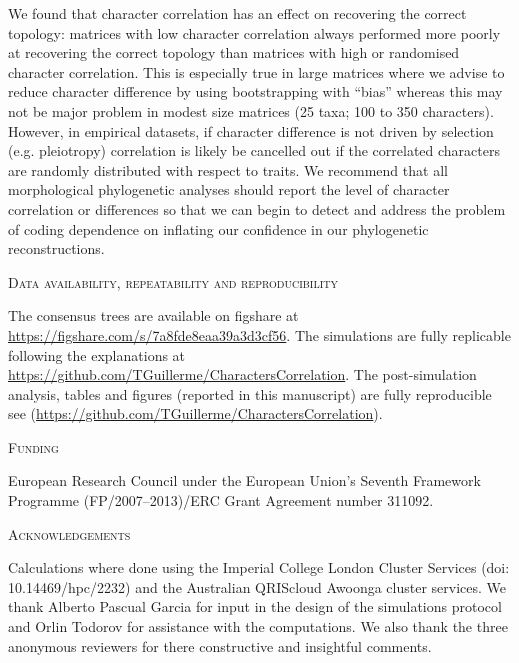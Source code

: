 \documentclass[12pt,letterpaper]{article}
\renewcommand{\section}[1]{%
\bigskip
\begin{center}
\begin{Large}
\normalfont\scshape #1
\medskip
\end{Large}
\end{center}}
\begin{document}
We found that character correlation has an effect on recovering the correct topology: matrices with low character correlation always performed more poorly at recovering the correct topology than matrices with high or randomised character correlation.
This is especially true in large matrices where we advise to reduce character difference by using bootstrapping with ``bias'' whereas this may not be major problem in modest size matrices (25 taxa; 100 to 350 characters).
However, in empirical datasets, if character difference is not driven by selection (e.g. pleiotropy) correlation is likely be cancelled out if the correlated characters are randomly distributed with respect to traits.
We recommend that all morphological phylogenetic analyses should report the level of character correlation or differences so that we can begin to detect and address the problem of coding dependence on inflating our confidence in our phylogenetic reconstructions.

\section{Data availability, repeatability and reproducibility}
The consensus trees are available on figshare at \url{https://figshare.com/s/7a8fde8eaa39a3d3cf56}.
The simulations are fully replicable following the explanations at \url{https://github.com/TGuillerme/CharactersCorrelation}.
The post-simulation analysis, tables and figures (reported in this manuscript) are fully reproducible see (\url{https://github.com/TGuillerme/CharactersCorrelation}).

\section{Funding}
European Research Council under the European Union’s Seventh Framework Programme (FP/2007–2013)/ERC Grant Agreement number 311092.

\section{Acknowledgements}
Calculations where done using the Imperial College London Cluster Services (doi: 10.14469/hpc/2232) and the Australian QRIScloud Awoonga cluster services. We thank Alberto Pascual Garcia for input in the design of the simulations protocol and Orlin Todorov for assistance with the computations. We also thank the three anonymous reviewers for there constructive and insightful comments.



\end{document}

